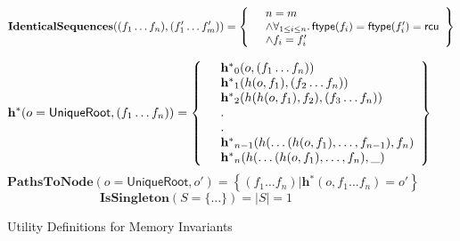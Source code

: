 \begin{figure*}[!htbp]
\footnotesize

\[
\textbf{IdenticalSequences}((f_1 \ldots f_n), (f'_1 \ldots f'_m) ) =
\left\{
\begin{array}{cl}
	& n = m \\
	& \land \forall_{1 \leq i \leq n} \ldotp \textsf{ftype}(f_i) = \textsf{ftype}(f'_i) = \textsf{rcu} \\
	& \land  f_i = f'_i 
\end{array}
\right\}
\]

\[
\textbf{h$^{*}$}(o = \textsf{UniqueRoot}, (f_1 \ldots f_n)) = 
\left\{
\begin{array}{cl}
	&\textbf{h$^{*}$}_{0}(o,(f_1 \ldots f_n)) \\
	&\textbf{h$^{*}$}_{1}( h(o,f_1), (f_2 \ldots f_n))   \\ 
	&\textbf{h$^{*}$}_{2}(h( h(o,f_1), f_2), (f_3 \ldots f_n))  \\
	&\ldotp \\ 
	&\ldotp \\
	&\textbf{h$^{*}$}_{n-1}(h(\ldots(h(o,f_1),\ldots, f_{n-1}),f_n)\\
	&\textbf{h$^{*}$}_{n}(h(\ldots(h(o,f_1),\ldots, f_{n}), \_)
\end{array}
\right\}
\]
\[
\textbf{PathsToNode}(o = \textsf{UniqueRoot} , o') = 
\left\{ (f_1 \ldots f_n) | \textbf{h$^{*}$}(o,f_1 \ldots f_n ) = o' \right\}
\]
\[
\textbf{IsSingleton}(S = \{\ldots\} ) = \mid S \mid = 1
\]

\caption{Utility Definitions for Memory Invariants}
\label{fig:definitionWellFormed-Utility}
\end{figure*}


